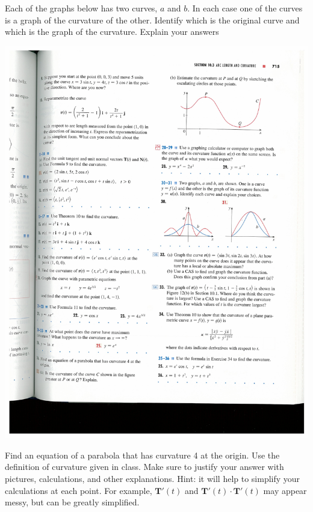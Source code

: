 \documentclass{ximera}
\begin{document}
\begin{problem}
Each of the graphs below has two curves, $a$ and $b$.  In each case one of the curves is a graph of the curvature of the other.  Identify which is the original curve and which is the graph of the curvature.  Explain your answers
\begin{image}
\includegraphics[width = \textwidth]{curvatures}
\end{image}
\end{problem}

\begin{problem}
Find an equation of a parabola that has curvature 4 at the origin.  Use the definition of curvature given in class.  Make sure to justify your answer with pictures, calculations, and other explanations.  Hint: it will help to simplify your calculations at each point.  For example, $\mathbf{T}'(t)$ and $\mathbf{T}'(t) \cdot \mathbf{T}'(t)$ may appear messy, but can be greatly simplified.
\end{problem}
\end{document}
